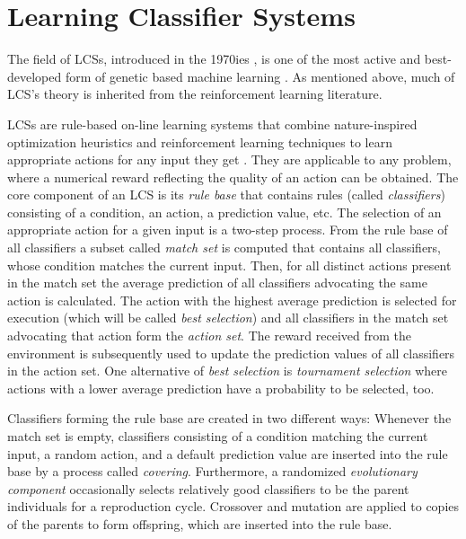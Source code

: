 \section{Learning Classifier Systems}
\label{section:learning-classifier-systems}

The field of LCSs, introduced in the 1970ies \cite{Hol75,Hol76,HR78}, is one of the most active and best-developed form of genetic based machine learning \cite{Kov02a,KL00,Lan08}. As mentioned above, much of LCS's theory is inherited from the reinforcement learning literature. %

LCSs are rule-based on-line learning systems that combine nature-inspired optimization heuristics and reinforcement learning techniques to learn appropriate actions for any input they get \cite{Wil95}. They are applicable to any problem, where a numerical reward reflecting the quality of an action can be obtained. The core component of an LCS is its \emph{rule base} that contains rules (called \emph{classifiers}) consisting of a condition, an action, a prediction value, etc. The selection of an appropriate action for a given input is a two-step process. From the rule base of all classifiers a subset called \emph{match set} is computed that contains all classifiers, whose condition matches the current input. Then, for all distinct actions present in the match set the average prediction of all classifiers advocating the same action is calculated. The action with the highest average prediction is selected for execution (which will be called \emph{best selection}) and all classifiers in the match set advocating that action form the \emph{action set}. The reward received from the environment is subsequently used to update the prediction values of all classifiers in the action set. One alternative of \emph{best selection} is \emph{tournament selection} \cite{Butz2003} where actions with a lower average prediction have a probability to be selected, too. 

Classifiers forming the rule base are created in two different ways: Whenever the match set is empty, classifiers consisting of a condition matching the current input, a random action, and a default prediction value are inserted into the rule base by a process called \emph{covering}. Furthermore, a randomized \emph{evolutionary component} occasionally selects relatively good classifiers to be the parent individuals for a reproduction cycle. Crossover and mutation are applied to copies of the parents to form offspring, which are inserted into the rule base. 


